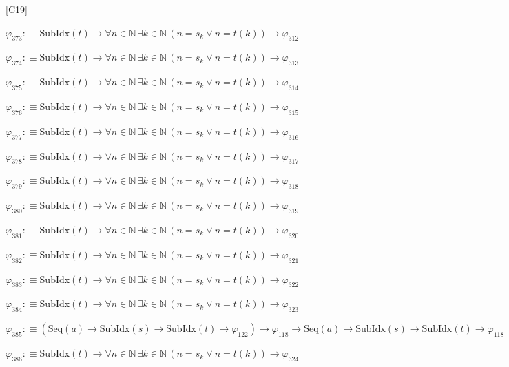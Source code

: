 \begin{fullproof}{[C19]}
\begin{abbrevlist}
\item $\varphi_{373} :\equiv \mathrm{SubIdx}(t) \to \forall n \in \mathbb{N}\,\exists k \in \mathbb{N}\,(n = s_{k} \lor n = t(k)) \to \varphi_{312}$
\item $\varphi_{374} :\equiv \mathrm{SubIdx}(t) \to \forall n \in \mathbb{N}\,\exists k \in \mathbb{N}\,(n = s_{k} \lor n = t(k)) \to \varphi_{313}$
\item $\varphi_{375} :\equiv \mathrm{SubIdx}(t) \to \forall n \in \mathbb{N}\,\exists k \in \mathbb{N}\,(n = s_{k} \lor n = t(k)) \to \varphi_{314}$
\item $\varphi_{376} :\equiv \mathrm{SubIdx}(t) \to \forall n \in \mathbb{N}\,\exists k \in \mathbb{N}\,(n = s_{k} \lor n = t(k)) \to \varphi_{315}$
\item $\varphi_{377} :\equiv \mathrm{SubIdx}(t) \to \forall n \in \mathbb{N}\,\exists k \in \mathbb{N}\,(n = s_{k} \lor n = t(k)) \to \varphi_{316}$
\item $\varphi_{378} :\equiv \mathrm{SubIdx}(t) \to \forall n \in \mathbb{N}\,\exists k \in \mathbb{N}\,(n = s_{k} \lor n = t(k)) \to \varphi_{317}$
\item $\varphi_{379} :\equiv \mathrm{SubIdx}(t) \to \forall n \in \mathbb{N}\,\exists k \in \mathbb{N}\,(n = s_{k} \lor n = t(k)) \to \varphi_{318}$
\item $\varphi_{380} :\equiv \mathrm{SubIdx}(t) \to \forall n \in \mathbb{N}\,\exists k \in \mathbb{N}\,(n = s_{k} \lor n = t(k)) \to \varphi_{319}$
\item $\varphi_{381} :\equiv \mathrm{SubIdx}(t) \to \forall n \in \mathbb{N}\,\exists k \in \mathbb{N}\,(n = s_{k} \lor n = t(k)) \to \varphi_{320}$
\item $\varphi_{382} :\equiv \mathrm{SubIdx}(t) \to \forall n \in \mathbb{N}\,\exists k \in \mathbb{N}\,(n = s_{k} \lor n = t(k)) \to \varphi_{321}$
\item $\varphi_{383} :\equiv \mathrm{SubIdx}(t) \to \forall n \in \mathbb{N}\,\exists k \in \mathbb{N}\,(n = s_{k} \lor n = t(k)) \to \varphi_{322}$
\item $\varphi_{384} :\equiv \mathrm{SubIdx}(t) \to \forall n \in \mathbb{N}\,\exists k \in \mathbb{N}\,(n = s_{k} \lor n = t(k)) \to \varphi_{323}$
\item $\varphi_{385} :\equiv (\mathrm{Seq}(a) \to \mathrm{SubIdx}(s) \to \mathrm{SubIdx}(t) \to \varphi_{122}) \to \varphi_{118} \to \mathrm{Seq}(a) \to \mathrm{SubIdx}(s) \to \mathrm{SubIdx}(t) \to \varphi_{118}$
\item $\varphi_{386} :\equiv \mathrm{SubIdx}(t) \to \forall n \in \mathbb{N}\,\exists k \in \mathbb{N}\,(n = s_{k} \lor n = t(k)) \to \varphi_{324}$

\end{abbrevlist}
\end{fullproof}
